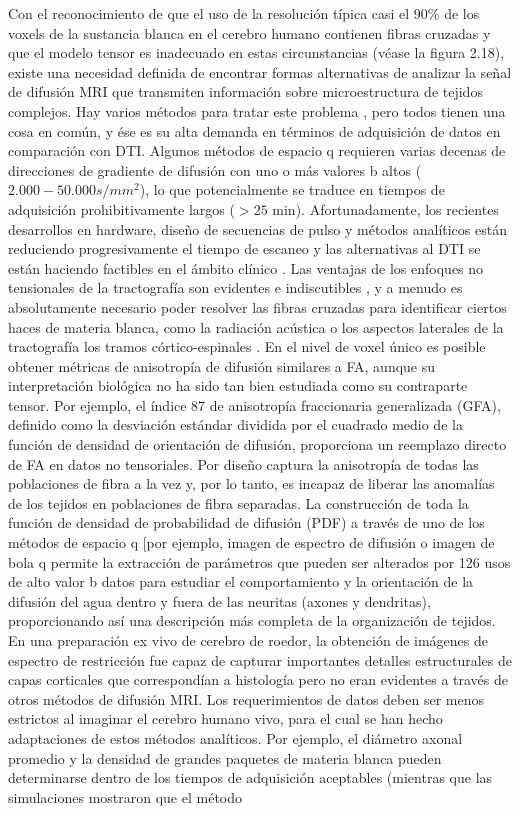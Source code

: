Con el reconocimiento de que el uso de la resolución típica casi el 90\% de los voxels de la sustancia blanca en el cerebro humano contienen fibras cruzadas \cite{Jeurissen_2012} y que el modelo tensor es inadecuado en estas circunstancias (véase la figura 2.18), existe una necesidad definida de encontrar formas alternativas de analizar la señal de difusión MRI que transmiten información sobre microestructura de tejidos complejos. Hay varios métodos para tratar este problema \cite{Jeurissen_2012}, pero todos tienen una cosa en común, y ése es su alta demanda en términos de adquisición de datos en comparación con DTI. Algunos métodos de espacio q requieren varias decenas de direcciones de gradiente de difusión con uno o más valores b altos ($2.000-50.000 s/mm^{2}$), lo que potencialmente se traduce en tiempos de adquisición prohibitivamente largos ($> 25$ min). Afortunadamente, los recientes desarrollos en hardware, diseño de secuencias de pulso y métodos analíticos \cite{Tuch_2002,prckovska_2013} están reduciendo progresivamente el tiempo de escaneo y las alternativas al DTI se están haciendo factibles en el ámbito clínico \cite{Reijmer_2012}. Las ventajas de los enfoques no tensionales de la tractografía son evidentes e indiscutibles \cite{Farquharson_2012}, y a menudo es absolutamente necesario poder resolver las fibras cruzadas para identificar ciertos haces de materia blanca, como la radiación acústica o los aspectos laterales de la tractografía los tramos córtico-espinales \cite{Behrens_2007}. En el nivel de voxel único es posible obtener métricas de anisotropía de difusión similares a FA, aunque su interpretación biológica no ha sido tan bien estudiada como su contraparte tensor. Por ejemplo, el índice 87 de anisotropía fraccionaria generalizada (GFA), definido como la desviación estándar dividida por el cuadrado medio de la función de densidad de orientación de difusión, proporciona un reemplazo directo de FA en datos no tensoriales. Por diseño captura la anisotropía de todas las poblaciones de fibra a la vez y, por lo tanto, es incapaz de liberar las anomalías de los tejidos en poblaciones de fibra separadas. La construcción de toda la función de densidad de probabilidad de difusión (PDF) a través de uno de los métodos de espacio q [por ejemplo, imagen de espectro de difusión \cite{Wedeen_2005} o imagen de bola q \cite{Tuch_2004} permite la extracción de parámetros que pueden ser alterados por 126 usos de alto valor b datos para estudiar el comportamiento y la orientación de la difusión del agua dentro y fuera de las neuritas (axones y dendritas), proporcionando así una descripción más completa de la organización de tejidos. En una preparación ex vivo de cerebro de roedor, la obtención de imágenes de espectro de restricción fue capaz de capturar importantes detalles estructurales de capas corticales que correspondían a histología pero no eran evidentes a través de otros métodos de difusión MRI. Los requerimientos de datos deben ser menos estrictos al imaginar el cerebro humano vivo, para el cual se han hecho adaptaciones de estos métodos analíticos. Por ejemplo, el diámetro axonal promedio y la densidad de grandes paquetes de materia blanca pueden determinarse dentro de los tiempos de adquisición aceptables (mientras que las simulaciones mostraron que el método 
